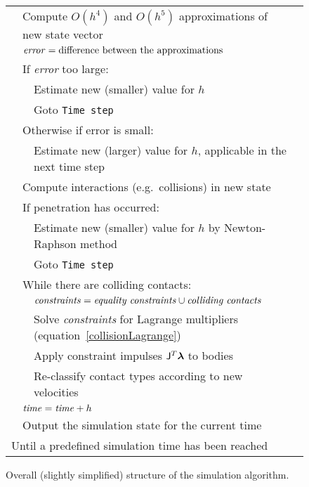 \begin{figure}
\begin{tabular}{|l|l|l|l|@{}l}
    &\multicolumn{3}{|l|}{Compute $O(h^4)$ and $O(h^5)$ approximations of new state vector}\\\cline{2-4}
    &\multicolumn{3}{|l|}{$\mbox{\textit{error}} = \mbox{difference between the approximations}$}\\\cline{2-4}
    &\multicolumn{3}{|l|}{If \textit{error} too large:}\\\cline{3-4}
        &&\multicolumn{2}{|l|}{Estimate new (smaller) value for $h$}\\\cline{3-4}
        &&\multicolumn{2}{|l|}{Goto \texttt{Time step}}\\\cline{2-4}
    &\multicolumn{3}{|l|}{Otherwise if error is small:}\\\cline{3-4}
        &&\multicolumn{2}{|l|}{Estimate new (larger) value for $h$, applicable in the next time step}\\\cline{2-4}
    &\multicolumn{3}{|l|}{Compute interactions (e.g.\ collisions) in new state}\\\cline{2-4}
    &\multicolumn{3}{|l|}{If penetration has occurred:}\\\cline{3-4}
        &&\multicolumn{2}{|l|}{Estimate new (smaller) value for $h$ by Newton-Raphson method}\\\cline{3-4}
        &&\multicolumn{2}{|l|}{Goto \texttt{Time step}}\\\cline{2-4}
    &\multicolumn{3}{|l|}{While there are colliding contacts:}\\\cline{3-4}
        &&\multicolumn{2}{|l|}{$\mbox{\textit{constraints}} = \mbox{\textit{equality constraints}}
        \cup \mbox{\textit{colliding contacts}}$}\\\cline{3-4}
        &&\multicolumn{2}{|l|}{Solve \textit{constraints} for Lagrange multipliers
        (equation~\ref{collisionLagrange})}&
        \zerobox{b}{\mbox{$\left\}\ref{collidingContact}\begin{array}{l}
        \spx\spx\spx\spx\spx\end{array}\right.$}}\\\cline{3-4}
        &&\multicolumn{2}{|l|}{Apply constraint impulses $\m{J}^T\ve{\lambda}$ to bodies}\\\cline{3-4}
        &&\multicolumn{2}{|l|}{Re-classify contact types according to new velocities}\\\cline{2-4}
    &\multicolumn{3}{|l|}{$\mbox{\textit{time}} = \mbox{\textit{time}} + h$}\\\cline{2-4}
    &\multicolumn{3}{|l|}{Output the simulation state for the current time}\\\cline{2-4}
\multicolumn{4}{|l|}{Until a predefined simulation time has been reached}\\\cline{1-4}
\end{tabular}
\caption{Overall (slightly simplified) structure of the simulation algorithm.}
\end{figure}
